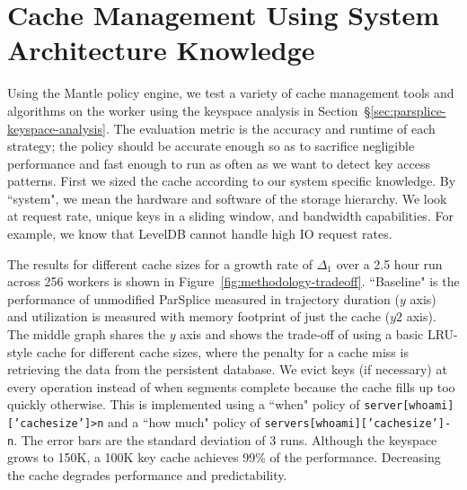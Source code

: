%
%
%
%

\section{Cache Management Using System Architecture Knowledge}
\label{sec:arch-specific}

Using the Mantle policy engine, we test a variety of cache management tools and
algorithms on the worker using the keyspace analysis in
Section~\S\ref{sec:parsplice-keyspace-analysis}.  The evaluation metric is the
accuracy and runtime of each strategy; the policy should be accurate enough so
as to sacrifice negligible performance and fast enough to run as often as we
want to detect key access patterns.  First we sized the cache according to our
system specific knowledge. By ``system", we mean the hardware and software of
the storage hierarchy. We look at request rate, unique keys in a sliding
window, and bandwidth capabilities. For example, we know that LevelDB cannot
handle high IO request rates.

The results for different cache sizes for a growth rate of \(\Delta_1\) over a
2.5 hour run across 256 workers is shown in
Figure~\ref{fig:methodology-tradeoff}.  ``Baseline" is the performance of
unmodified ParSplice  measured in trajectory duration (\(y\) axis) and
utilization is measured with memory footprint of just the cache (\(y2\) axis).
The middle graph shares the \(y\) axis and shows the trade-off of using a basic
LRU-style cache for different cache sizes, where the penalty for a cache miss
is retrieving the data from the persistent database.  We evict keys (if
necessary) at every operation instead of when segments complete because the
cache fills up too quickly otherwise. This is implemented using a ``when"
policy of \texttt{server[whoami]['cachesize']>n} and a ``how much" policy of
\texttt{servers[whoami]['cachesize']-n}.  The error bars are the standard
deviation of 3 runs.  Although the keyspace grows to 150K, a 100K key cache
achieves 99\% of the performance. Decreasing the cache degrades performance and
predictability.

